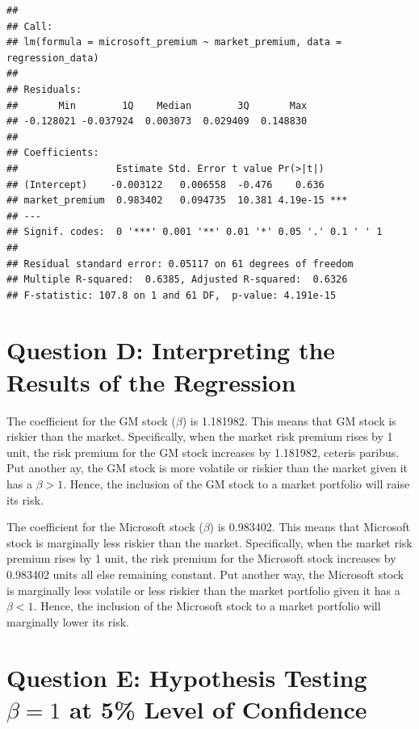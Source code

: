 \documentclass[
]{article}
\begin{document}
\begin{verbatim}
## 
## Call:
## lm(formula = microsoft_premium ~ market_premium, data = regression_data)
## 
## Residuals:
##       Min        1Q    Median        3Q       Max 
## -0.128021 -0.037924  0.003073  0.029409  0.148830 
## 
## Coefficients:
##                 Estimate Std. Error t value Pr(>|t|)    
## (Intercept)    -0.003122   0.006558  -0.476    0.636    
## market_premium  0.983402   0.094735  10.381 4.19e-15 ***
## ---
## Signif. codes:  0 '***' 0.001 '**' 0.01 '*' 0.05 '.' 0.1 ' ' 1
## 
## Residual standard error: 0.05117 on 61 degrees of freedom
## Multiple R-squared:  0.6385, Adjusted R-squared:  0.6326 
## F-statistic: 107.8 on 1 and 61 DF,  p-value: 4.191e-15
\end{verbatim}

\hypertarget{question-d-interpreting-the-results-of-the-regression}{%
\section{\texorpdfstring{\textbf{Question D: Interpreting the Results of
the
Regression}}{Question D: Interpreting the Results of the Regression}}\label{question-d-interpreting-the-results-of-the-regression}}

The coefficient for the GM stock (\(\beta\)) is 1.181982. This means
that GM stock is riskier than the market. Specifically, when the market
risk premium rises by 1 unit, the risk premium for the GM stock
increases by 1.181982, ceteris paribus. Put another ay, the GM stock is
more volatile or riskier than the market given it has a \(\beta > 1\).
Hence, the inclusion of the GM stock to a market portfolio will raise
its risk.

The coefficient for the Microsoft stock (\(\beta\)) is 0.983402. This
means that Microsoft stock is marginally less riskier than the market.
Specifically, when the market risk premium rises by 1 unit, the risk
premium for the Microsoft stock increases by 0.983402 units all else
remaining constant. Put another way, the Microsoft stock is marginally
less volatile or less riskier than the market portfolio given it has a
\(\beta < 1\). Hence, the inclusion of the Microsoft stock to a market
portfolio will marginally lower its risk.

\hypertarget{question-e-hypothesis-testing-beta-1-at-5-level-of-confidence}{%
\section{\texorpdfstring{\textbf{Question E: Hypothesis Testing
\(\beta = 1\) at 5\% Level of
Confidence}}{Question E: Hypothesis Testing \textbackslash beta = 1 at 5\% Level of Confidence}}\label{question-e-hypothesis-testing-beta-1-at-5-level-of-confidence}}
\end{document}
